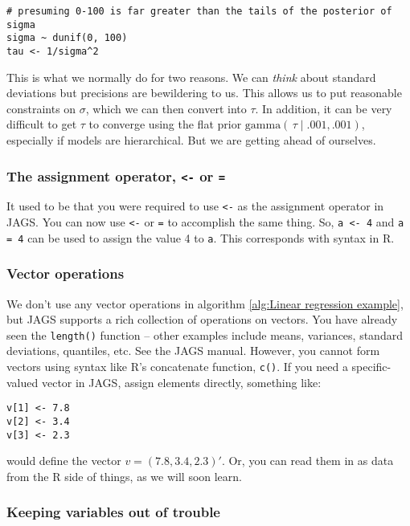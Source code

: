 \documentclass[12pt,english]{article}
\begin{document}
\begin{Verbatim}
# presuming 0-100 is far greater than the tails of the posterior of sigma
sigma ~ dunif(0, 100) 
tau <- 1/sigma^2
\end{Verbatim}

\noindent This is what we normally do for two reasons. We can \emph{think} about standard deviations but precisions are bewildering to us. This allows us to put reasonable constraints on $\sigma$, which we can then convert into $\tau$. In addition, it can be very difficult to get $\tau$ to converge using the flat prior $\textrm{gamma}(\,\tau \mid .001,.001)$, especially if models are hierarchical. But we are getting ahead of ourselves.

\subsubsection{The assignment operator, \texttt{<-} or \texttt{=}}

It used to be that you were required to use \texttt{<-} as the assignment operator in JAGS. You can now use \texttt{<-} or \texttt{=}  to accomplish the same thing.  So, \texttt{a <- 4} and \texttt{a = 4} can be used to assign the value 4 to \texttt{a}.  This corresponds with syntax in R.

\subsubsection{Vector operations}

We don't use any vector operations in algorithm \ref{alg:Linear regression example}, but JAGS supports a rich collection of operations on vectors. You have already seen the \texttt{length()} function -- other examples include means, variances, standard deviations, quantiles, etc. See the JAGS manual. However, you cannot form vectors using syntax like R's concatenate function, \texttt{c()}. If you need a specific-valued vector in JAGS, assign elements directly, something like:

\begin{Verbatim}
v[1] <- 7.8
v[2] <- 3.4
v[3] <- 2.3
\end{Verbatim}

\noindent would define the vector $v=(7.8,3.4,2.3)'$. Or, you can read them in as data from the R side of things, as we will soon learn.

\subsubsection{Keeping variables out of trouble}
\end{document}
